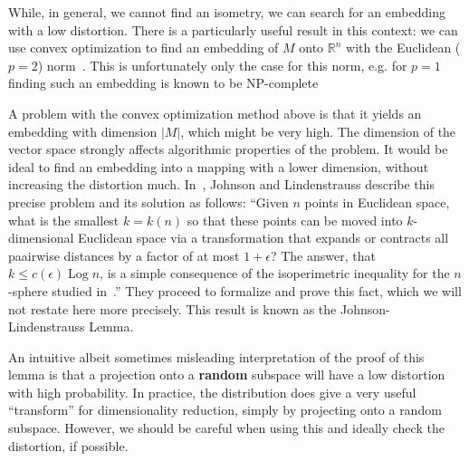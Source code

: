 While, in general, we cannot find an isometry, we can search for an embedding with a low distortion.
There is a particularly useful result in this context:
we can use convex optimization to find an embedding of $M$ onto $\mathbb{R}^n$ with the Euclidean ($p=2$) norm~\cite{matouvsek}.
This is unfortunately only the case for this norm, e.g. for $p=1$ finding such an embedding is known to be NP-complete~\cite{matouvsek}

A problem with the convex optimization method above is that it yields an embedding with dimension $|M|$, which might be very high.
The dimension of the vector space strongly affects algorithmic properties of the problem. 
It would be ideal to find an embedding into a mapping with a lower dimension, without increasing the distortion much.
In~\cite{johnson_lindenstrauss}, Johnson and Lindenstrauss describe this precise problem and its solution as follows: 
``Given $n$ points in Euclidean space, what is the smallest $k = k(n)$ so that these points can be moved into $k$-dimensional Euclidean space via a transformation that expands or contracts all paairwise distances by a factor of at most $1 + \epsilon$? The answer, that $k \leq c(\epsilon) \operatorname{Log} n$, is a simple consequence of the isoperimetric inequality for the $n$-sphere studied in~\cite{figiel1977dimension}.''
They proceed to formalize and prove this fact, which we will not restate here more precisely.
This  result is known as the Johnson-Lindenstrauss Lemma. 

An intuitive albeit sometimes misleading interpretation of the proof of this lemma is that a projection onto a \textbf{random} subspace will have a low distortion with high probability.
In practice, the distribution does give a very useful ``transform'' for dimensionality reduction, simply by projecting onto a random subspace.
However, we should be careful when using this and ideally check the distortion, if possible.